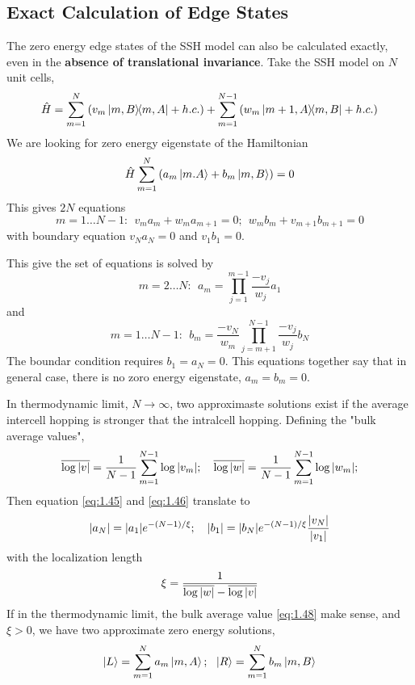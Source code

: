 \subsection{Exact Calculation of Edge States}\label{sec:1.5.6}
The zero energy edge states of the SSH model can also be calculated exactly, even in the \textbf{absence of translational invariance}.
Take the SSH model on $N$ unit cells,
\begin{equation}\label{eq:1.42}
    \hat{H} = \sum_{m=1}^N \left( v_m \dyad{m,B}{m,A} + h.c. \right) + \sum_{m=1}^{N-1} \left( w_m \dyad{m+1,A}{m,B} + h.c. \right)
\end{equation}
We are looking for zero energy eigenstate of the Hamiltonian
\begin{equation}\label{eq:1.43}
    \hat{H} \sum_{m=1}^N \left( a_m \ket{m.A} + b_m\ket{m,B} \right) = 0
\end{equation}
This gives $2N$ equations
\begin{equation}
    m = 1 \dots N-1: ~ ~ v_m a_m + w_m a_{m+1} = 0; ~ ~ w_m b_m + v_{m+1} b_{m+1} = 0 \label{eq:1.44}
\end{equation}
with boundary equation $v_N a_N = 0 $ and $v_1 b_1 = 0$.

This give the set of equations is solved by
\begin{equation}
    m = 2\dots N: ~ ~ a_m = \prod_{j=1}^{m-1} \frac{-v_j}{w_j}a_1 \label{eq:1.45}
\end{equation}
and
\begin{equation}
    m = 1\dots N-1: ~ ~ b_m = \frac{-v_N}{w_m} \prod^{N-1}_{j= m+1} \frac{-v_j}{w_j} b_N \label{eq:1.46}
\end{equation}
The boundar condition requires $b_1 = a_N = 0$.
This equations together say that in general case, there is no zoro energy eigenstate, $a_m = b_m = 0$.

In thermodynamic limit, $N\to \infty$, two approximaste solutions exist if the average intercell hopping is stronger that the intralcell hopping.
Defining the "bulk average values",
\begin{equation}
    \overline{\log \abs{v}} = \frac{1}{N-1} \sum_{m=1}^{N-1} \log \abs{v_m};~ ~ ~     \overline{\log \abs{w}} = \frac{1}{N-1} \sum_{m=1}^{N-1} \log \abs{w_m};  \label{eq:1.48}
\end{equation}
Then equation \eqref{eq:1.45} and \eqref{eq:1.46} translate to
\begin{equation}
    \abs{a_N} = \abs{a_1} e^{-(N-1)/\xi}; ~ ~ ~ \abs{b_1} = \abs{b_N} e^{-(N-1)/\xi} \frac{\abs{v_N}}{\abs{v_1}}  \label{eq:1.49}
\end{equation}
with the localization length
\begin{equation}
    \xi = \frac{1}{ \overline{\log{\abs{w}}} - \overline{\log{\abs{v}}} } \label{eq:1.50}
\end{equation}
If in the thermodynamic limit, the bulk average value \eqref{eq:1.48} make sense, and $\xi>0$, we have two approximate zero energy solutions,
\begin{equation}
    \ket{L} = \sum_{m=1}^N a_m \ket{m,A}; ~ ~ \ket{R} = \sum_{m=1}^N b_m \ket{m,B}  \label{eq:1.51}
\end{equation}
